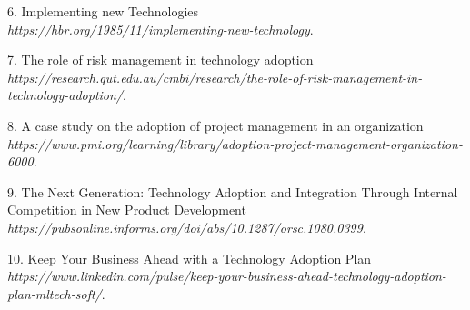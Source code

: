 \documentclass[11pt,letterpaper]{report}
\begin{document}
\begin{thebibliography}{5}
        6.  Implementing new Technologies
        \\\textit{https://hbr.org/1985/11/implementing-new-technology}. 
        \vspace{0.5cm}
        
        7.  The role of risk management in technology adoption
        \\\textit{https://research.qut.edu.au/cmbi/research/the-role-of-risk-management-in-technology-adoption/}. 
        \vspace{0.5cm}

        8.  A case study on the adoption of project management in an organization
        \\\textit{https://www.pmi.org/learning/library/adoption-project-management-organization-6000}. 
        \vspace{0.5cm}

        9.  The Next Generation: Technology Adoption and Integration Through Internal Competition in New Product Development
        \\\textit{https://pubsonline.informs.org/doi/abs/10.1287/orsc.1080.0399}. 
        \vspace{0.5cm}
        
        10. Keep Your Business Ahead with a Technology Adoption Plan
        \\\textit{https://www.linkedin.com/pulse/keep-your-business-ahead-technology-adoption-plan-mltech-soft/}. 
        


  


    
\end{thebibliography}
\end{document}
